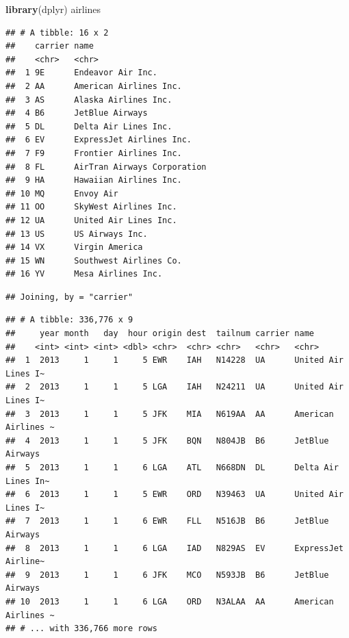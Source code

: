 \documentclass[]{book}
\newenvironment{Shaded}{\begin{snugshade}}{\end{snugshade}}
\newcommand{\CommentTok}[1]{\textcolor[rgb]{0.56,0.35,0.01}{\textit{#1}}}
\newcommand{\KeywordTok}[1]{\textcolor[rgb]{0.13,0.29,0.53}{\textbf{#1}}}
\newcommand{\NormalTok}[1]{#1}
\newcommand{\OperatorTok}[1]{\textcolor[rgb]{0.81,0.36,0.00}{\textbf{#1}}}
\newcommand{\StringTok}[1]{\textcolor[rgb]{0.31,0.60,0.02}{#1}}
\theoremstyle{definition}
\theoremstyle{definition}
\theoremstyle{definition}
\theoremstyle{remark}
\begin{document}
\begin{Shaded}
\begin{Highlighting}[]
\KeywordTok{library}\NormalTok{(dplyr) }
\NormalTok{airlines  }
\end{Highlighting}
\end{Shaded}

\begin{verbatim}
## # A tibble: 16 x 2
##    carrier name                       
##    <chr>   <chr>                      
##  1 9E      Endeavor Air Inc.          
##  2 AA      American Airlines Inc.     
##  3 AS      Alaska Airlines Inc.       
##  4 B6      JetBlue Airways            
##  5 DL      Delta Air Lines Inc.       
##  6 EV      ExpressJet Airlines Inc.   
##  7 F9      Frontier Airlines Inc.     
##  8 FL      AirTran Airways Corporation
##  9 HA      Hawaiian Airlines Inc.     
## 10 MQ      Envoy Air                  
## 11 OO      SkyWest Airlines Inc.      
## 12 UA      United Air Lines Inc.      
## 13 US      US Airways Inc.            
## 14 VX      Virgin America             
## 15 WN      Southwest Airlines Co.     
## 16 YV      Mesa Airlines Inc.
\end{verbatim}

\begin{Shaded}
\end{Shaded}

\begin{verbatim}
## Joining, by = "carrier"
\end{verbatim}

\begin{verbatim}
## # A tibble: 336,776 x 9
##     year month   day  hour origin dest  tailnum carrier name               
##    <int> <int> <int> <dbl> <chr>  <chr> <chr>   <chr>   <chr>              
##  1  2013     1     1     5 EWR    IAH   N14228  UA      United Air Lines I~
##  2  2013     1     1     5 LGA    IAH   N24211  UA      United Air Lines I~
##  3  2013     1     1     5 JFK    MIA   N619AA  AA      American Airlines ~
##  4  2013     1     1     5 JFK    BQN   N804JB  B6      JetBlue Airways    
##  5  2013     1     1     6 LGA    ATL   N668DN  DL      Delta Air Lines In~
##  6  2013     1     1     5 EWR    ORD   N39463  UA      United Air Lines I~
##  7  2013     1     1     6 EWR    FLL   N516JB  B6      JetBlue Airways    
##  8  2013     1     1     6 LGA    IAD   N829AS  EV      ExpressJet Airline~
##  9  2013     1     1     6 JFK    MCO   N593JB  B6      JetBlue Airways    
## 10  2013     1     1     6 LGA    ORD   N3ALAA  AA      American Airlines ~
## # ... with 336,766 more rows
\end{verbatim}
\end{document}
